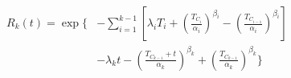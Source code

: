 \documentclass{article}
\begin{document}
\begin{equation}\label{eq:regression}
\begin{split}\begin{aligned}
R_k(t) = \exp\Bigg\{&
-\sum_{i=1}^{k-1}
\left[
\lambda_i T_i
+\left(\frac{T_{C_i}}{\alpha_i}\right)^{\beta_i}
-\left(\frac{T_{C_{i-1}}}{\alpha_i}\right)^{\beta_i}
\right]\\
&-\lambda_k t
-\left(\frac{T_{C_{k-1}}+t}{\alpha_k}\right)^{\beta_k}
+\left(\frac{T_{C_{k-1}}}{\alpha_k}\right)^{\beta_k}
\Bigg\}
\end{aligned}\end{split}
\end{equation}
\end{document}
